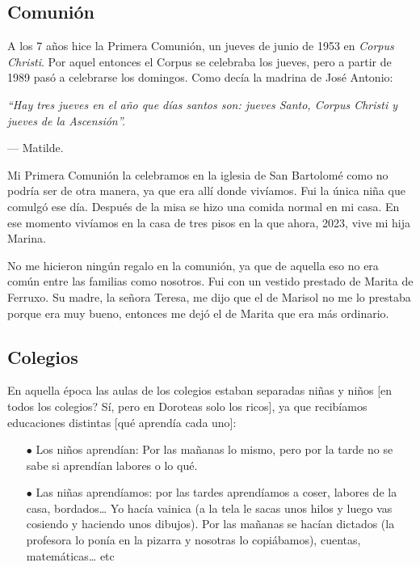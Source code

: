 \documentclass[12pt,a5paper]{book}
\begin{document}
\subsection*{Comunión}

A los 7 años hice la Primera Comunión, un jueves de junio de 1953 en \textit{Corpus Christi}. Por aquel entonces el Corpus se celebraba los jueves, pero a partir de 1989 pasó a celebrarse los domingos. Como decía la madrina de José Antonio:
\begin{center}
\textit{``Hay tres jueves en el año que días santos son: jueves Santo, Corpus Christi y jueves de la Ascensión''.}
\begin{flushright}
  — Matilde.
\end{flushright}
\end{center}

Mi Primera Comunión la celebramos en la iglesia de San Bartolomé como no podría ser de otra manera, ya que era allí donde vivíamos. Fui la única niña que comulgó ese día. Después de la misa se hizo una comida normal en mi casa. En ese momento vivíamos en la casa de tres pisos en la que ahora, 2023, vive mi hija Marina.

No me hicieron ningún regalo en la comunión, ya que de aquella eso no era común entre las familias como nosotros. Fui con un vestido prestado de Marita de Ferruxo. Su madre, la señora Teresa, me dijo que el de Marisol no me lo prestaba porque era muy bueno, entonces me dejó el de Marita que era más ordinario.


\subsection*{Colegios}

En aquella época las aulas de los colegios estaban separadas niñas y niños [en todos los colegios? Sí, pero en Doroteas solo los ricos], ya que recibíamos educaciones distintas [qué aprendía cada uno]:

\begin{itemize}
	\item[$\bullet$] Los niños aprendían: Por las mañanas lo mismo, pero por la tarde no se sabe si aprendían labores o lo qué.
	\item[$\bullet$] Las niñas aprendíamos: por las tardes aprendíamos a coser, labores de la casa, bordados… Yo hacía vainica (a la tela le sacas unos hilos y luego vas cosiendo y haciendo unos dibujos). Por las mañanas se hacían dictados (la profesora lo ponía en la pizarra y nosotras lo copiábamos), cuentas, matemáticas… etc
\end{itemize}
\end{document}
